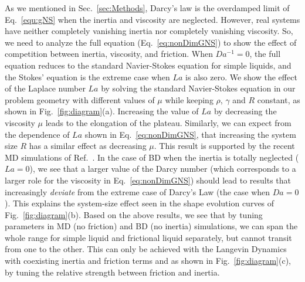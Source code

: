 \documentclass[%
reprint,
amsmath,amssymb,
aps,
]{revtex4-2}
\begin{document}
	As we mentioned in Sec.~\ref{sec:Methods}, Darcy's law is the overdamped limit of Eq.~\ref{equ:gNS} when the inertia and viscosity are neglected. However, real systems have neither completely vanishing inertia nor completely vanishing viscosity. So, we need to analyze the full equation (Eq.~\ref{eq:nonDimGNS}) to show the effect of competition between inertia, viscosity, and friction. When $Da^{-1}=0$, the full equation reduces to the standard Navier-Stokes equation for simple liquids, and the Stokes' equation is the extreme case when $La$ is also zero. We show the effect of the Laplace number $La$ by solving the standard Navier-Stokes equation in our problem geometry with different values of $\mu$ while keeping $\rho$, $\gamma$ and $R$ constant, as shown in Fig.~\ref{fig:diagram}(a). Increasing the value of $La$ by decreasing the viscosity $\mu$ leads to the elongation of the plateau. Similarly, we can expect from the dependence  of $La$ shown in Eq.~\ref{eq:nonDimGNS}, that increasing the system size $R$ has a similar effect as decreasing $\mu$. This result is supported by the recent MD simulations of Ref.~\cite{heinenDropletCoalescenceMolecular2022a}. In the case of BD when the inertia is totally neglected ($La=0$), we see that a larger value of the Darcy number (which corresponds to a larger role for the viscosity in Eq.~\ref{eq:nonDimGNS}) should lead to results that increasingly \emph{deviate} from the extreme case of Darcy's Law (the case when $Da=0$). This explains the system-size effect seen in the shape evolution curves of Fig.~\ref{fig:diagram}(b). Based on the above results, we see that by tuning parameters in MD (no friction) and BD (no inertia) simulations, we can span the whole range for simple liquid and frictional liquid separately, but cannot transit from one to the other. This can only be achieved with the Langevin Dynamics with coexisting inertia and friction terms and as shown in Fig.~\ref{fig:diagram}(c), by tuning the relative strength between friction and inertia.  
	
\end{document}
